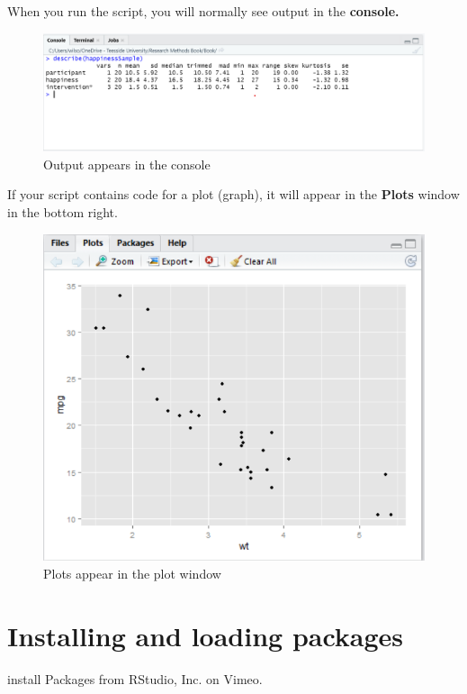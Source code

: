\documentclass[
]{book}
\begin{document}
When you run the script, you will normally see output in the \textbf{console.}

\begin{figure}
\centering
\includegraphics{images/console.png}
\caption{Output appears in the console}
\end{figure}

If your script contains code for a plot (graph), it will appear in the \textbf{Plots} window in the bottom right.

\begin{figure}
\centering
\includegraphics{images/plotwindow.png}
\caption{Plots appear in the plot window}
\end{figure}

\hypertarget{installing-and-loading-packages}{%
\section{Installing and loading packages}\label{installing-and-loading-packages}}

install Packages from RStudio, Inc. on Vimeo.
\end{document}
